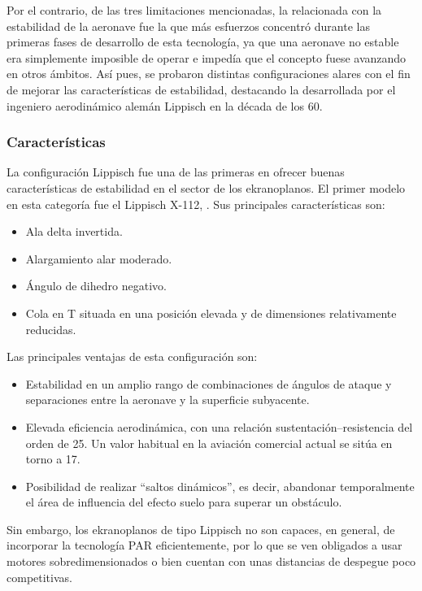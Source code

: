 Por el contrario, de las tres limitaciones mencionadas, la relacionada con la estabilidad de la aeronave fue la que más esfuerzos concentró durante las primeras fases de desarrollo de esta tecnología, ya que una aeronave no estable era simplemente imposible de operar e impedía que el concepto fuese avanzando en otros ámbitos. Así pues, se probaron distintas configuraciones alares con el fin de mejorar las características de estabilidad, destacando la desarrollada por el ingeniero aerodinámico alemán Lippisch en la década de los 60.


\subsubsection{Características}
\label{sec:wig:lippisch:characteristics}

La configuración Lippisch fue una de las primeras en ofrecer buenas características de estabilidad en el sector de los ekranoplanos. El primer modelo en esta categoría fue el Lippisch X-112, . Sus principales características son:
\begin{itemize}
\item Ala delta invertida.
\item Alargamiento alar moderado.
\item Ángulo de dihedro negativo.
\item Cola en T situada en una posición elevada y de dimensiones relativamente reducidas.
\end{itemize}

Las principales ventajas de esta configuración son:
\begin{itemize}
\item Estabilidad en un amplio rango de combinaciones de ángulos de ataque y separaciones entre la aeronave y la superficie subyacente.
\item Elevada eficiencia aerodinámica, con una relación sustentación–resistencia del orden de 25. Un valor habitual en la aviación comercial actual se sitúa en torno a 17.
\item Posibilidad de realizar “saltos dinámicos”, es decir, abandonar temporalmente el área de influencia del efecto suelo para superar un obstáculo.
\end{itemize}

Sin embargo, los ekranoplanos de tipo Lippisch no son capaces, en general, de incorporar la tecnología PAR eficientemente, por lo que se ven obligados a usar motores sobredimensionados o bien cuentan con unas distancias de despegue poco competitivas.

